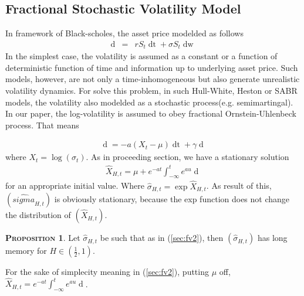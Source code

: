 \documentclass[a4paper, twoside, 11pt]{article}
\theoremstyle{definition}
\newtheorem{proposition}[definition]{\scshape Proposition}
\begin{document}
\subsection{Fractional Stochastic Volatility Model}
In framework of Black-scholes, the asset price modelded as follows
\begin{eqnarray}
  \mathop{dS_t} &=& rS_t\mathop{dt} + \sigma S_t \mathop{dw}
\end{eqnarray}
In the simplest case, the volatility is assumed as a constant or a function of deterministic function of time and information up to underlying asset price. Such models, however, are not only a time-inhomogeneous but also generate unrealistic volatility dynamics. For solve this problem, in 
such  Hull-White, Heston or SABR models, the volatility also modelded as a stochastic process(e.g. semimartingal).\\
In our paper,  the log-volatility is assumed to obey fractional Ornstein-Uhlenbeck process. That means

\begin{eqnarray}
  \mathop{dX_t} = -a(X_t - \mu)\mathop{dt} + \gamma \mathop{dU_H(t)}
  \label{sec:fv}
\end{eqnarray}
where $X_t=\log(\sigma_t)$. As in proceeding section, we have a stationary solution 
\begin{eqnarray}
\hat{X}_{H,t}=\mu + e^{-at}\int_{-\infty}^t e^{au}\mathop{dU_H(u)}
\label{sec:fv2}
\end{eqnarray}
for an appropriate initial value.  Where $\hat{\sigma}_{H,t} = \exp{\hat{X}_{H,t}}$. As result of this, $(\hat{sigma}_{H,t})$ is obviously stationary, because the exp function does not change the distribution of $(\hat{X}_{H,t})$.
 
\begin{proposition}
  Let $\hat{\sigma}_{H,t}$ be such that as in (\ref{sec:fv2}), then $(\hat{\sigma}_{H,t})$ has long memory for $H\in(\frac{1}{2}, 1)$. 
\end{proposition}
For the sake of simplecity meaning in (\ref{sec:fv2}), putting $\mu$ off,$\hat{X}_{H,t}= e^{-at}\int_{-\infty}^t e^{au}\mathop{dU_H(u)}$.
\end{document}
